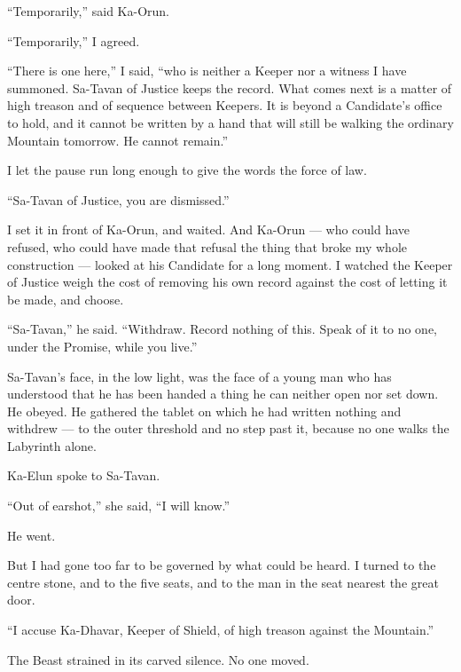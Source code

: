 ``Temporarily,'' said Ka-Orun.\par
 
``Temporarily,'' I agreed.

``There is one here,'' I said, ``who is neither a Keeper nor a witness I have summoned. Sa-Tavan of Justice keeps the record. What comes next is a matter of high treason and of sequence between Keepers. It is beyond a Candidate's office to hold, and it cannot be written by a hand that will still be walking the ordinary Mountain tomorrow. He cannot remain.''\par

I let the pause run long enough to give the words the force of law.

``Sa-Tavan of Justice, you are dismissed.''

I set it in front of Ka-Orun, and waited. And Ka-Orun --- who could have refused, who could have made that refusal the thing that broke my whole construction --- looked at his Candidate for a long moment. 
I watched the Keeper of Justice weigh the cost of removing his own record against the cost of letting it be made, and choose.\par
 
``Sa-Tavan,'' he said. ``Withdraw. Record nothing of this. Speak of it to no one, under the Promise, while you live.''\par
 
Sa-Tavan's face, in the low light, was the face of a young man who has understood that he has been handed a thing he can neither open nor set down. He obeyed.
He gathered the tablet on which he had written nothing and withdrew --- to the outer threshold and no step past it, because no one walks the Labyrinth alone. 

Ka-Elun spoke to Sa-Tavan.\par
 
``Out of earshot,'' she said, ``I will know.''\par
 
He went.\par
 
But I had gone too far to be governed by what could be heard. I turned to the centre stone, and to the five seats, and to the man in the seat nearest the great door.\par
 
``I accuse Ka-Dhavar, Keeper of Shield, of high treason against the Mountain.''\par
 
The Beast strained in its carved silence. No one moved.\par
 
